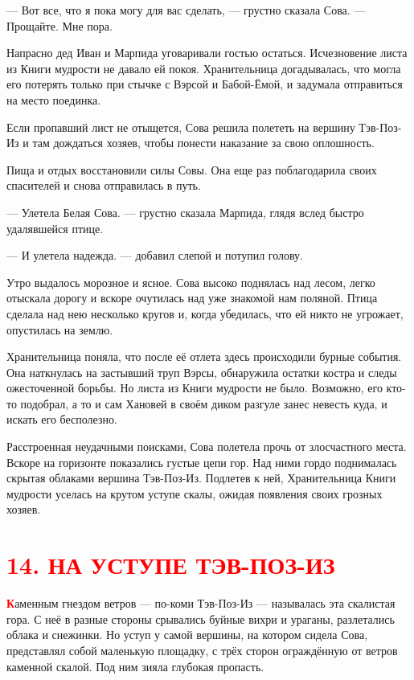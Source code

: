 \documentclass[12pt, a4paper, openany]{book}
\begin{document}
	— Вот все, что я пока могу для вас сделать, — грустно сказала Сова. — Прощайте. Мне пора.
	
	Напрасно дед Иван и Марпида уговаривали гостью остаться. Исчезновение листа из Книги мудрости не давало ей покоя. Хранительница догадывалась, что могла его потерять только при стычке с Вэрсой и Бабой-Ёмой, и задумала отправиться на место поединка.
	
	Если пропавший лист не отыщется, Сова решила полететь на вершину Тэв-Поз-Из и там дождаться хозяев, чтобы понести наказание за свою оплошность.
	
	Пища и отдых восстановили силы Совы. Она еще раз поблагодарила своих спасителей и снова отправилась в путь.
	
	— Улетела Белая Сова. — грустно сказала Марпида, глядя вслед быстро удалявшейся птице.
	
	— И улетела надежда. — добавил слепой и потупил голову.
	
	Утро выдалось морозное и ясное. Сова высоко поднялась над лесом, легко отыскала дорогу и вскоре очутилась над уже знакомой нам поляной. Птица сделала над нею несколько кругов и, когда убедилась, что ей никто не угрожает, опустилась на землю.
	
	Хранительница поняла, что после её отлета здесь происходили бурные события. Она наткнулась на застывший труп Вэрсы, обнаружила остатки костра и следы ожесточенной борьбы. Но листа из Книги мудрости не было. Возможно, его кто-то подобрал, а то и сам Хановей в своём диком разгуле занес невесть куда, и искать его бесполезно.
	
	Расстроенная неудачными поисками, Сова полетела прочь от злосчастного места. Вскоре на горизонте показались густые цепи гор. Над ними гордо поднималась скрытая облаками вершина Тэв-Поз-Из. Подлетев к ней, Хранительница Книги мудрости уселась на крутом уступе скалы, ожидая появления своих грозных хозяев.
	
	
			\section[14. На уступе Тэв-Поз-Из]{\center \textcolor{red}{14. НА УСТУПЕ ТЭВ-ПОЗ-ИЗ}}
	
	
\lettrine[findent=0pt]{\textbf{\textcolor{red}{К}}}{}аменным гнездом ветров — по-коми Тэв-Поз-Из — называлась эта скалистая гора. С неё в разные стороны срывались буйные вихри и ураганы, разлетались облака и снежинки. Но уступ у самой вершины, на котором сидела Сова, представлял собой маленькую площадку, с трёх сторон ограждённую от ветров каменной скалой. Под ним зияла глубокая пропасть.
	
\end{document}

